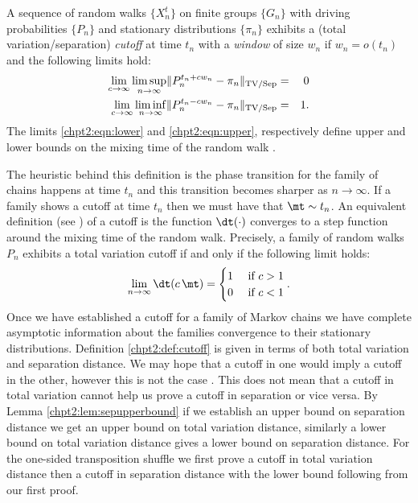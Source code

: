 \documentclass[11pt]{report}
\begin{document}
\begin{defn}
	\label{chpt2:def:cutoff}
	A sequence of random walks $\{X_{n}^{t}\}$ on finite groups $\{G_{n}\}$ with driving probabilities 	$\{P_{n}\}$ and 
	stationary distributions $\{\pi_{n}\}$ exhibits a (total 
	variation/separation) \emph{cutoff} at time 
	$t_{n}$ with a \emph{window} of size $w_{n}$ if $w_{n}=o(t_{n})$ 
	and the 
	following limits hold:
	\begin{eqnarray}
	\lim_{c\rightarrow \infty}\limsup_{n\rightarrow \infty} \lVert P_{n}^{t_{n} 
		+cw_{n}} -\pi_{n} \rVert_{\textnormal{TV/Sep}}&=&0 
	\label{chpt2:eqn:upper} \\
	\lim_{c\rightarrow \infty}\liminf_{n\rightarrow \infty} \lVert P_{n}^{t_{n} 
		-cw_{n}} -\pi_{n} \rVert_{\textnormal{TV/Sep}} &=&1 
	\label{chpt2:eqn:lower}.
	\end{eqnarray}
	The limits \eqref{chpt2:eqn:lower} and \eqref{chpt2:eqn:upper}, respectively define upper and lower bounds on the mixing time of the random walk .
\end{defn}

The heuristic behind this definition is the phase transition for the family of 
chains happens at time $t_{n}$ and this transition becomes sharper as 
$n\to\infty$. If a family shows a cutoff at time $t_{n}$ then we must have that 
$\mt \sim t_{n}$.  An equivalent definition (see \cite[Lemma 18.1]{Levin2017}) of a 
cutoff is the function $\dt(\cdot)$ converges to a step 
function around the mixing time of the random walk. Precisely, a family of random walks $P_{n}$ exhibits a total variation cutoff if and only if the following limit holds:
\[\lim_{n\to\infty} \dt(c\, \mt) = \begin{cases} 
1 & \textnormal{ if } c>1 \\
0 & \textnormal{ if } c<1 \end{cases}.\] 
Once we have established a cutoff for a 
family of Markov chains we have complete asymptotic information about the families convergence to their stationary distributions. Definition \ref{chpt2:def:cutoff} is given in 
terms of both total variation and separation distance. We may hope that a cutoff in one would imply a cutoff in the other, however this is not the case \cite{hermon2016total}.
This does not mean that a cutoff in total variation cannot help us prove 
a cutoff in separation or vice versa. By Lemma 
\ref{chpt2:lem:sepupperbound} if we establish an upper bound on separation 
distance we get an upper bound on total variation distance, similarly a lower bound on 
total variation distance gives a lower bound on separation distance. For the one-sided 
transposition shuffle we first prove a cutoff in total variation distance then a 
cutoff in separation distance with the lower bound following from our first proof. 
\end{document}

